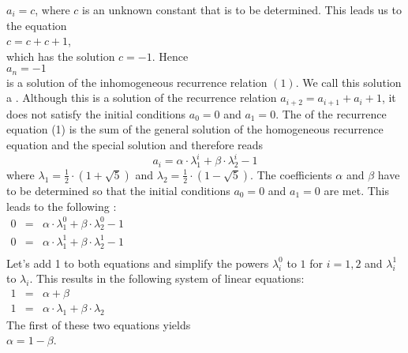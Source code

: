 $a_i = c$, where $c$ is an unknown constant that is to be determined.  This leads us to the equation \\[0.2cm] 
\hspace*{1.3cm}
$c = c + c + 1$,
\\[0.2cm]
which has the solution $c = -1$.  Hence
\\[0.2cm]
\hspace*{1.3cm}
$a_n = -1$ 
\\[0.2cm]
is a solution of the inhomogeneous recurrence relation $(1)$. We call this solution a .
  Although this is a solution of the recurrence relation $a_{i+2} = a_{i+1} + a_i + 1$,
it does not satisfy the initial conditions $a_0 = 0$ and $a_1 = 0$.
The   of the recurrence equation (1) 
is the sum of the general solution of the homogeneous recurrence equation and the special
solution and therefore reads 
\[ a_i = \alpha \cdot \lambda_1^i + \beta \cdot \lambda_2^i - 1 \]
where $\lambda_1 = \frac{1}{2}\cdot (1 + \sqrt{5})$ and $\lambda_2 = \frac{1}{2}\cdot (1 - \sqrt{5})$.
The coefficients $\alpha$ and $\beta$ have to be determined so that the
initial conditions $a_0 = 0$ and $a_1 = 0$ are met.  This leads to the following
: 
\\[0.2cm]
\hspace*{1.3cm}
$\begin{array}{lcl}
    0 & = & \alpha \cdot \lambda_1^0 + \beta \cdot \lambda_2^0 - 1 \\[0.1cm]
    0 & = & \alpha \cdot \lambda_1^1 + \beta \cdot \lambda_2^1 - 1 \\
  \end{array}
  $
\\[0.2cm]
Let's add 1 to both equations and simplify the powers $\lambda_i^0$ to $1$ for $i=1,2$ and
$\lambda_i^1$ to $\lambda_i$.  This results in the following system of linear equations:
\\[0.2cm]
\hspace*{1.3cm}
$ \begin{array}{lcl}
    1 & = & \alpha + \beta \\[0.1cm]
    1 & = & \alpha \cdot \lambda_1 + \beta \cdot \lambda_2 
  \end{array}
$
\\[0.2cm]
The first of these two equations yields
\\[0.2cm]
\hspace*{1.3cm}
$\alpha = 1 - \beta$.
\\[0.2cm]
